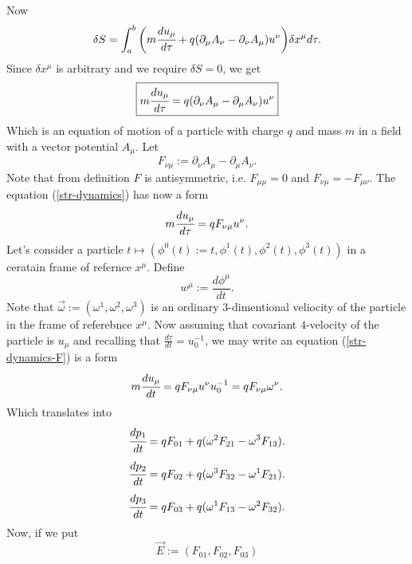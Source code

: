 \documentclass[main.tex]{subfiles}
\begin{document}
Now
\begin{equation}
\delta S = \int_a^b \bigg( m \cfrac{du_\mu}{d\tau} 
+ q(\partial_\mu A_\nu - \partial_\nu A_\mu) u^\nu 
\bigg) \delta x^\mu d\tau.
\end{equation}
Since $\delta x^\mu$ is arbitrary and we require $\delta S = 0$, we get
\begin{equation}
\label{str-dynamics}
\boxed{
m \cfrac{du_\mu}{d\tau} = q(\partial_\nu A_\mu - \partial_\mu A_\nu) u^\nu
}
\end{equation}
Which is an equation of motion of a particle with charge $q$ and mass $m$ in a field with a vector potential $A_\mu$.
Let
\begin{equation}
F_{\nu\mu} := \partial_\nu A_\mu - \partial_\mu A_\nu.
\end{equation}
Note that from definition $F$ is antisymmetric, i.e. $F_{\mu \mu} = 0$ and $F_{\nu\mu} = - F_{\mu\nu}$. 
The equation (\ref{str-dynamics}) has now a form
\begin{equation}
\label{str-dynamics-F}
m \cfrac{du_\mu}{d\tau} = qF_{\nu\mu} u^\nu.
\end{equation}
Let's consider a particle $t\mapsto(\phi^0(t):= t, \phi^1(t), \phi^2(t), \phi^3(t))$ in a ceratain frame of refernce $x^\mu$.
Define
\begin{equation}
w^\mu := \frac{d\phi^\mu}{dt}.
\end{equation}
Note that $\vec{\omega} := (\omega^1, \omega^2, \omega^3)$ is an ordinary $3$-dimentional veliocity of the particle in the frame of referebnce $x^\mu$. Now assuming that covariant $4$-velocity of the particle is $u_\mu$ and recalling that $\frac{d\tau}{dt} = u_0^{-1}$, we may write an equation (\ref{str-dynamics-F}) is a form
\begin{equation}
m \cfrac{du_\mu}{dt} = qF_{\nu\mu}u^\nu u_0^{-1} = qF_{\nu\mu} \omega^\nu.
\end{equation}
Which translates into
\begin{equation}
\cfrac{dp_1}{dt} = q F_{01} + q(\omega^2 F_{21} - \omega^3 F_{13}).
\end{equation}
\begin{equation}
\cfrac{dp_2}{dt} = q F_{02} + q(\omega^3 F_{32} - \omega^1 F_{21}).
\end{equation}
\begin{equation}
\cfrac{dp_3}{dt} = q F_{03} + q(\omega^1 F_{13} - \omega^2 F_{32}).
\end{equation}
Now, if we put
\begin{equation}
\vec{E} := (F_{01}, F_{02}, F_{03})
\end{equation}
\end{document}
